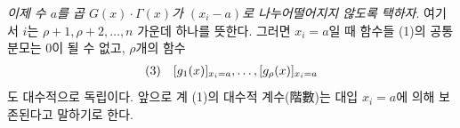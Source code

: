 
\emph{이제 수 $a$를 곱 $G(x)\cdot\Gamma(x)$가 $(x_i-a)$로 나누어떨어지지 않도록 택하자}. 여기서 $i$는 $\rho+1,\rho+2,\ldots,n$ 가운데 하나를 뜻한다. 그러면 $x_i=a$일 때 함수들 (1)의 공통분모는 0이 될 수 없고, $\rho$개의 함수
\[
\begin{array}{@{}r@{\quad}l@{}}
(3)& [g_1(x)]_{x_i=a},\ldots,[g_\rho(x)]_{x_i=a}
\end{array}
\]
도 대수적으로 독립이다. 앞으로 계 (1)의 대수적 계수(階數)는 대입 $x_i=a$에 의해 보존된다고 말하기로 한다.
